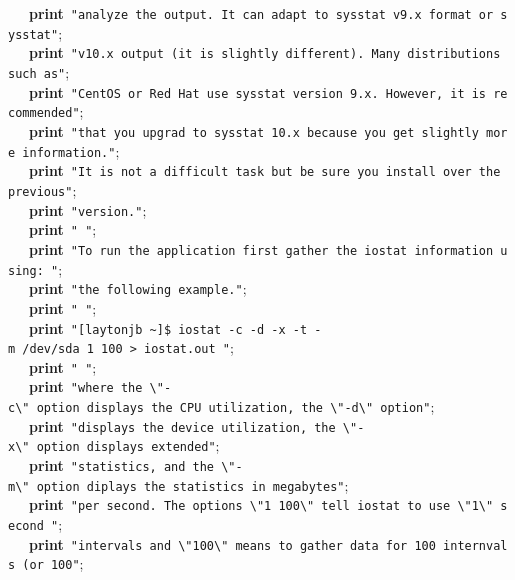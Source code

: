 \mbox{}\ \ \ \textbf{print}\ \texttt{"{}analyze\ the\ output.\ It\ can\ adapt\ to\ sysstat\ v9.x\ format\ or\ sysstat"{}}; \\
\mbox{}\ \ \ \textbf{print}\ \texttt{"{}v10.x\ output\ (it\ is\ slightly\ different).\ Many\ distributions\ such\ as"{}}; \\
\mbox{}\ \ \ \textbf{print}\ \texttt{"{}CentOS\ or\ Red\ Hat\ use\ sysstat\ version\ 9.x.\ However,\ it\ is\ recommended"{}}; \\
\mbox{}\ \ \ \textbf{print}\ \texttt{"{}that\ you\ upgrad\ to\ sysstat\ 10.x\ because\ you\ get\ slightly\ more\ information."{}}; \\
\mbox{}\ \ \ \textbf{print}\ \texttt{"{}It\ is\ not\ a\ difficult\ task\ but\ be\ sure\ you\ install\ over\ the\ previous"{}}; \\
\mbox{}\ \ \ \textbf{print}\ \texttt{"{}version."{}}; \\
\mbox{}\ \ \ \textbf{print}\ \texttt{"{}\ "{}}; \\
\mbox{}\ \ \ \textbf{print}\ \texttt{"{}To\ run\ the\ application\ first\ gather\ the\ iostat\ information\ using:\ "{}}; \\
\mbox{}\ \ \ \textbf{print}\ \texttt{"{}the\ following\ example."{}}; \\
\mbox{}\ \ \ \textbf{print}\ \texttt{"{}\ "{}}; \\
\mbox{}\ \ \ \textbf{print}\ \texttt{"{}[laytonjb\ \textasciitilde{}]\$\ iostat\ -c\ -d\ -x\ -t\ -m\ /dev/sda\ 1\ 100\ \textgreater{}\ iostat.out\ "{}}; \\
\mbox{}\ \ \ \textbf{print}\ \texttt{"{}\ "{}}; \\
\mbox{}\ \ \ \textbf{print}\ \texttt{"{}where\ the\ \textbackslash{}"{}-c\textbackslash{}"{}\ option\ displays\ the\ CPU\ utilization,\ the\ \textbackslash{}"{}-d\textbackslash{}"{}\ option"{}}; \\
\mbox{}\ \ \ \textbf{print}\ \texttt{"{}displays\ the\ device\ utilization,\ the\ \textbackslash{}"{}-x\textbackslash{}"{}\ option\ displays\ extended"{}}; \\
\mbox{}\ \ \ \textbf{print}\ \texttt{"{}statistics,\ and\ the\ \textbackslash{}"{}-m\textbackslash{}"{}\ option\ diplays\ the\ statistics\ in\ megabytes"{}}; \\
\mbox{}\ \ \ \textbf{print}\ \texttt{"{}per\ second.\ The\ options\ \textbackslash{}"{}1\ 100\textbackslash{}"{}\ tell\ iostat\ to\ use\ \textbackslash{}"{}1\textbackslash{}"{}\ second\ "{}}; \\
\mbox{}\ \ \ \textbf{print}\ \texttt{"{}intervals\ and\ \textbackslash{}"{}100\textbackslash{}"{}\ means\ to\ gather\ data\ for\ 100\ internvals\ (or\ 100"{}}; \\
